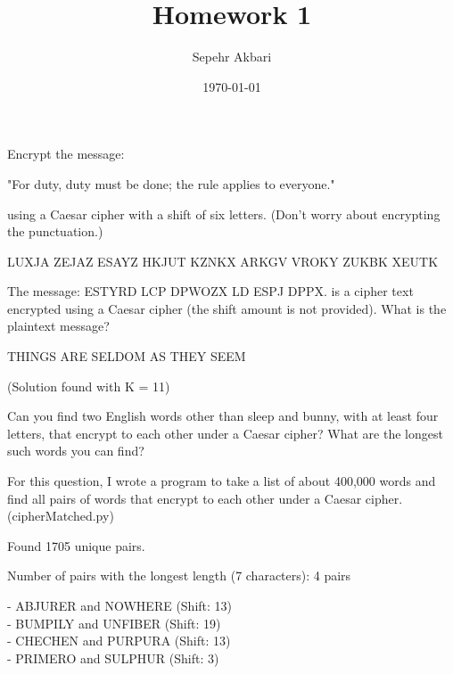 \documentclass{my-cls}
\title{Homework 1}
\author{Sepehr Akbari}
\date{\today}
\begin{document}
\maketitle
\thispagestyle{firststyle}



\begin{problem}[1.1]
Encrypt the message:

"For duty, duty must be done;
the rule applies to everyone."

using a Caesar cipher with a shift of six letters. (Don't worry about encrypting the punctuation.)
\end{problem}

\begin{solution}[1.1]
LUXJA ZEJAZ ESAYZ HKJUT KZNKX ARKGV VROKY ZUKBK XEUTK
\end{solution}

\bigskip

\begin{problem}[1.2]
The message:
ESTYRD LCP DPWOZX LD ESPJ DPPX.
is a cipher text encrypted using a Caesar cipher (the shift amount is not provided). What is the plaintext message?
\end{problem}

\begin{solution}[1.2]
THINGS ARE SELDOM AS THEY SEEM

\smallskip

(Solution found with K = 11)
\end{solution}

\bigskip

\begin{problem}[1.3]
Can you find two English words other than sleep and bunny, with at least four letters, that encrypt to each other under a Caesar cipher? What are the longest such words you can find?
\end{problem}

\begin{solution}[1.3]
For this question, I wrote a program to take a list of about 400,000 words and find all pairs of words that encrypt to each other under a Caesar cipher. (cipherMatched.py)

\medskip

Found 1705 unique pairs.

Number of pairs with the longest length (7 characters): 4 pairs

\smallskip

- ABJURER and NOWHERE (Shift: 13)\\
- BUMPILY and UNFIBER (Shift: 19)\\
- CHECHEN and PURPURA (Shift: 13)\\
- PRIMERO and SULPHUR (Shift: 3)
\end{solution}
\end{document}
